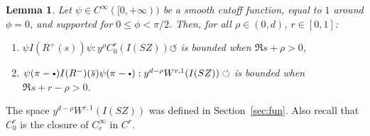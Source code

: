 \documentclass[JEP,XML,SOM,Unicode,NoFloatCountersInSection]{cedram}
\newcommand{\sbullet}{{\scriptscriptstyle\bullet}}
\newcommand{\csbullet}{{\raisebox{1pt}{$\sbullet$}}}
\newcommand{\ZZ}{I(SZ)}
\theoremstyle{plain}
\newtheorem{lemma}{Lemma}[section]
\theoremstyle{definition}
\begin{document}
\begin{lemma}\label{lemma:boundedness-resolvent-in-cusp}
Let $\psi \in C^\infty([0,+\infty))$ be a smooth cutoff function, equal to $1$ around $\phi=0$, and supported for $0 \leq \phi<\pi/2$. Then, for all $\rho\in (0,d)$, $r \in [0,1]$:
\begin{enumerate}
\item\label{lemma:boundedness-resolvent-in-cusp1} $\psi I(R^+(s)) \psi : y^\rho C^r_0(\ZZ) \circlearrowleft$ is bounded when $\Re s + \rho>0$,
\item\label{lemma:boundedness-resolvent-in-cusp2} $\psi(\pi-\csbullet) I(R^-)(\overline{s}) \psi(\pi-\csbullet) : y^{d-\rho} W^{r,1}(\ZZ) \circlearrowleft$ is bounded when $\Re s + r-\rho>0$.
\end{enumerate}
\end{lemma}
The space $y^{d-\rho} W^{r,1}(\ZZ)$ was defined in Section~\ref{sec:fun}. Also recall that $C^r_0$ is the closure of $C^\infty_c$ in $C^r$.
\end{document}
